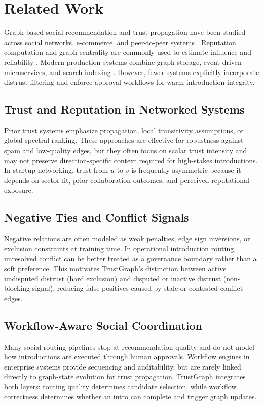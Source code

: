 \documentclass[conference]{IEEEtran}
\begin{document}
\section{Related Work}
Graph-based social recommendation and trust propagation have been studied across social networks, e-commerce, and peer-to-peer systems \cite{newman2018networks,kamvar2003eigentrust,golbeck2006trust}. Reputation computation and graph centrality are commonly used to estimate influence and reliability \cite{freeman1978centrality,page1999pagerank}. Modern production systems combine graph storage, event-driven microservices, and search indexing \cite{newman2015microservices,kleppmann2017ddia}. However, fewer systems explicitly incorporate distrust filtering and enforce approval workflows for warm-introduction integrity.

\subsection{Trust and Reputation in Networked Systems}
Prior trust systems emphasize propagation, local transitivity assumptions, or global spectral ranking. These approaches are effective for robustness against spam and low-quality edges, but they often focus on scalar trust intensity and may not preserve direction-specific context required for high-stakes introductions. In startup networking, trust from $u$ to $v$ is frequently asymmetric because it depends on sector fit, prior collaboration outcomes, and perceived reputational exposure.

\subsection{Negative Ties and Conflict Signals}
Negative relations are often modeled as weak penalties, edge sign inversions, or exclusion constraints at training time. In operational introduction routing, unresolved conflict can be better treated as a governance boundary rather than a soft preference. This motivates TrustGraph's distinction between active undisputed distrust (hard exclusion) and disputed or inactive distrust (non-blocking signal), reducing false positives caused by stale or contested conflict edges.

\subsection{Workflow-Aware Social Coordination}
Many social-routing pipelines stop at recommendation quality and do not model how introductions are executed through human approvals. Workflow engines in enterprise systems provide sequencing and auditability, but are rarely linked directly to graph-state evolution for trust propagation. TrustGraph integrates both layers: routing quality determines candidate selection, while workflow correctness determines whether an intro can complete and trigger graph updates.
\end{document}
